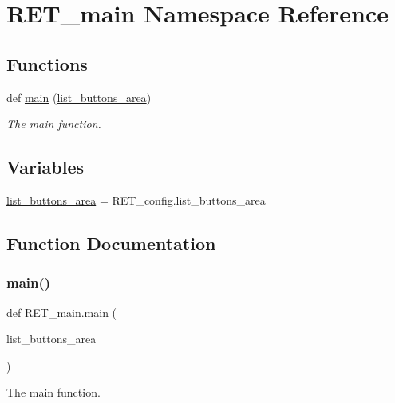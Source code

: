 \hypertarget{namespaceRET__main}{}\section{R\+E\+T\+\_\+main Namespace Reference}
\label{namespaceRET__main}
\subsection*{Functions}
\begin{DoxyCompactItemize}
\item 
def \hyperlink{namespaceRET__main_aa865772e295c54935897bbf98cad85d8}{main} (\hyperlink{namespaceRET__main_ac4848af5696d2d98e426d3d775d6964d}{list\+\_\+buttons\+\_\+area})
\begin{DoxyCompactList}\small\item\em The main function. \end{DoxyCompactList}\end{DoxyCompactItemize}
\subsection*{Variables}
\begin{DoxyCompactItemize}
\item 
\hyperlink{namespaceRET__main_ac4848af5696d2d98e426d3d775d6964d}{list\+\_\+buttons\+\_\+area} = R\+E\+T\+\_\+config.\+list\+\_\+buttons\+\_\+area
\end{DoxyCompactItemize}


\subsection{Function Documentation}
\mbox{\label{namespaceRET__main_aa865772e295c54935897bbf98cad85d8}} 
\subsubsection{\texorpdfstring{main()}{main()}}
{\footnotesize\ttfamily def R\+E\+T\+\_\+main.\+main (\begin{DoxyParamCaption}\item[{}]{list\+\_\+buttons\+\_\+area }\end{DoxyParamCaption})}



The main function. 

